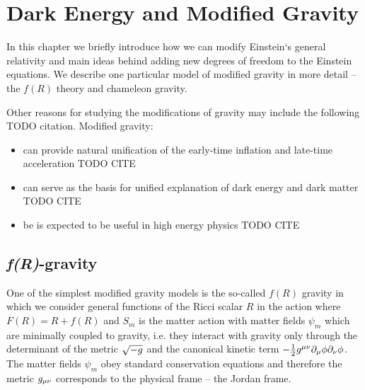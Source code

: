 \chapter{Dark Energy and Modified Gravity}


In this chapter we briefly introduce how we can modify Einstein`s general relativity and main ideas behind adding new degrees of freedom to the Einstein equations. We describe one particular model of modified gravity in more detail -- the $f(R)$ theory and chameleon gravity.

Other reasons for studying the modifications of gravity may include the following TODO citation. Modified gravity:
\begin{itemize}
	\item can provide natural unification of the early-time inflation and late-time acceleration TODO CITE
	\item can serve as the basis for unified explanation of dark energy and dark matter TODO CITE
	\item be is expected to be useful in high energy physics TODO CITE
\end{itemize}

\section{\textit{f(R)}-gravity}
One of the simplest modified gravity models is the so-called $f(R)$ gravity in which we consider general functions of the Ricci scalar $R$ in the action
where $F(R)=R+f(R)$ and $S_m$ is the matter action with matter fields $\psi_m$ which are minimally coupled to gravity, i.e. they interact with gravity only through the determinant of the metric $\sqrt{-g}$ and the canonical kinetic term $-\frac12g^{\mu\nu}\partial_\mu\phi\partial_\nu\phi$. The matter fields $\psi_m$ obey standard conservation equations and therefore the metric $g_{\mu\nu}$ corresponds to the physical frame -- the Jordan frame.

